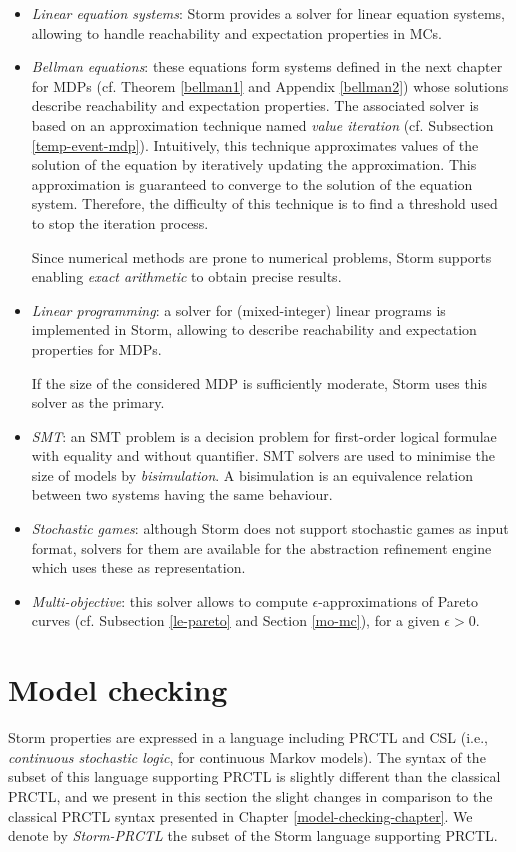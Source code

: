 \begin{itemize}
  \item \textit{Linear equation systems}: Storm provides a
    solver for linear equation systems, allowing to handle reachability and expectation properties in MCs.
  \item \textit{Bellman equations}: these equations form
    systems defined in the next chapter for MDPs (cf. Theorem
    \ref{bellman1} and Appendix \ref{bellman2}) whose solutions describe
    reachability and expectation properties.
    The associated solver is based on an approximation technique named \textit{value iteration} (cf. Subsection \ref{temp-event-mdp}).
    Intuitively, this technique approximates values of the solution of the equation by iteratively updating the approximation. This approximation is guaranteed to converge to the solution of the equation system.
    Therefore, the difficulty of this technique is to find a threshold used to stop the iteration process.
    \par Since numerical methods are prone to numerical problems, Storm supports enabling \textit{exact arithmetic} to obtain precise results.
  \item \textit{Linear programming}: a solver for (mixed-integer) linear programs is implemented in Storm, allowing to describe reachability and expectation properties for MDPs.\par
  If the size of the considered MDP is sufficiently moderate, Storm uses this solver as the primary.
  \item \textit{SMT}: an SMT problem is a decision problem for first-order logical formulae with equality and without quantifier. SMT solvers are used to minimise the size of models by \textit{bisimulation}.
  A bisimulation is an equivalence relation between two systems having the same behaviour.
  \item \textit{Stochastic games}: although Storm does not support stochastic games as input format,
    solvers for them are available for the abstraction refinement engine
    which uses these as representation.
  \item \textit{Multi-objective}: this solver allows to compute $\epsilon$-approximations of Pareto curves (cf. Subsection \ref{le-pareto} and Section \ref{mo-mc}), for a given $\epsilon > 0$.
\end{itemize}

\section{Model checking}
Storm properties are expressed in a language including PRCTL and CSL (i.e., \textit{continuous stochastic logic}, for continuous Markov models).
The syntax of the subset of this language supporting PRCTL is slightly different than the classical PRCTL, and we present in this section the slight changes in comparison to the classical PRCTL syntax presented in Chapter \ref{model-checking-chapter}. We denote by \textit{Storm-PRCTL} the subset of the Storm language supporting PRCTL.

